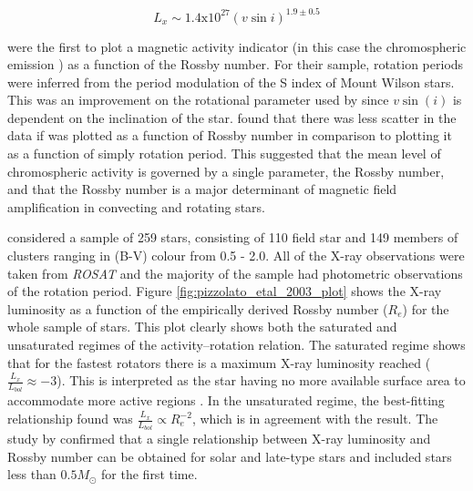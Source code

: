 \begin{equation}
    L_{x} \sim 1.4\text{x}10^{27}(v\sin i)^{1.9 \pm 0.5}
    \label{Eq:pallavicini_81}
\end{equation}

\citet{Noyes_etal_1984} were the first to plot a magnetic activity indicator (in this case the chromospheric emission \Rprime) as a function of the Rossby number. For their sample, rotation periods were inferred from the period modulation of the S index of Mount Wilson stars. This was an improvement on the rotational parameter used by \citet{Pallavicini_etal_1981} since $v\sin(i)$ is dependent on the inclination of the star. \citet{Noyes_etal_1984} found that there was less scatter in the data if \Rprime was plotted as a function of Rossby number in comparison to plotting it as a function of simply rotation period. This suggested that the mean level of chromospheric activity is governed by a single parameter, the Rossby number, and that the Rossby number is a major determinant of magnetic field amplification in convecting and rotating stars.

\citet{Pizzolato_etal_2003} considered a sample of 259 stars, consisting of 110 field star and 149 members of clusters ranging in (B-V) colour from 0.5 - 2.0. All of the X-ray observations were taken from \textit{ROSAT} and the majority of the sample had photometric observations of the rotation period. Figure \ref{fig:pizzolato_etal_2003_plot} shows the X-ray luminosity as a function of the empirically derived Rossby number ($R_{e}$) for the whole sample of stars. This plot clearly shows both the saturated and unsaturated regimes of the activity--rotation relation. The saturated regime shows that for the fastest rotators there is a maximum X-ray luminosity reached ($\frac{L_{x}}{L_{bol}} \approx -3$). This is interpreted as the star having no more available surface area to accommodate more active regions \citep{Jardine_Unruh_1999}. In the unsaturated regime, the best-fitting relationship found was $\frac{L_{x}}{L_{bol}} \propto R_{e}^{-2}$, which is in agreement with the \citet{Pallavicini_etal_1981} result. The study by \citet{Pizzolato_etal_2003} confirmed that a single relationship between X-ray luminosity and Rossby number can be obtained for solar and late-type stars and included stars less than $0.5 M_{\odot}$ for the first time.

